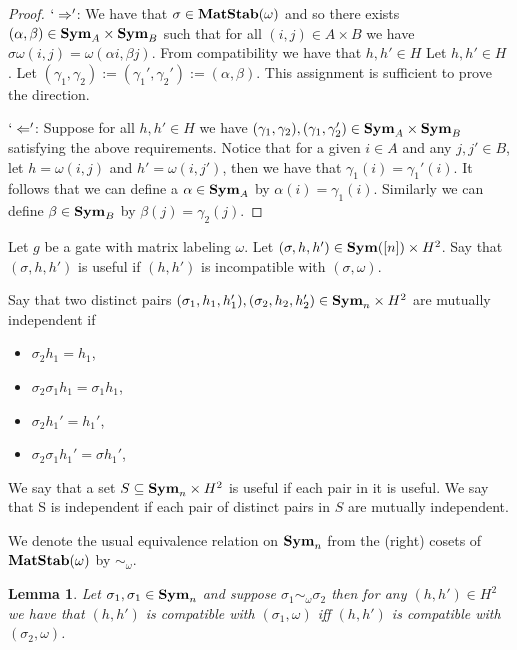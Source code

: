 \documentclass[12pt]{report}
\newtheorem{lem}[thm]{Lemma} \newtheorem{prop}[thm]{Proposition}
\newcommand{\matstab}{\text{\textbf{MatStab}}}
\newcommand{\sym}{\text{\textbf{Sym}}}
\begin{document}
\begin{proof}
  $`\Rightarrow'$: We have that $\sigma \in \matstab(\omega)$ and so there
  exists $(\alpha, \beta) \in \sym_A \times \sym_B$ such that for all $(i,j) \in
  A \times B$ we have $\sigma \omega (i,j) = \omega (\alpha i, \beta j)$. From
  compatibility we have that $h,h' \in H$ Let $h, h' \in H$ . Let $(\gamma_1,
  \gamma_2) := (\gamma_1', \gamma_2') := (\alpha, \beta)$. This assignment is
  sufficient to prove the direction.

  $`\Leftarrow'$: Suppose for all $h,h' \in H$ we have $(\gamma_1, \gamma_2),
  (\gamma_1, \gamma_2') \in \sym_A \times \sym_B$ satisfying the above
  requirements. Notice that for a given $i \in A$ and any $j, j' \in B$, let $h
  = \omega(i,j)$ and $h' = \omega(i,j')$, then we have that $\gamma_1 (i) =
  \gamma_1'(i)$. It follows that we can define a $\alpha \in \sym_A$ by
  $\alpha(i) = \gamma_1 (i)$. Similarly we can define $\beta \in \sym_B$ by
  $\beta (j) = \gamma_2 (j)$.

\end{proof}

\begin{definition}
  Let $g$ be a gate with matrix labeling $\omega$. Let $(\sigma, h, h') \in
  \sym([n]) \times H^2$. Say that $(\sigma, h, h')$ is useful if $(h,h')$ is
  incompatible with $(\sigma, \omega)$.

  Say that two distinct pairs $(\sigma_1, h_1, h_1'), (\sigma_2, h_2, h_2') \in
  \sym_n\times H^2$ are mutually independent if
  \begin{itemize}
    \setlength\itemsep{0mm}
  \item $\sigma_2 h_1 = h_1$,
  \item $\sigma_2 \sigma_1 h_1 = \sigma_1 h_1$,
  \item $\sigma_2 h_1' = h_1'$,
  \item $\sigma_2 \sigma_1 h_1' = \sigma h_1'$,
  \end{itemize}
  We say that a set $S \subseteq \sym_n \times H^2$ is useful if each pair in
  it is useful. We say that S is independent if each pair of distinct pairs in
  $S$ are mutually independent.
\end{definition}

We denote the usual equivalence relation on $\sym_n$ from the (right) cosets of
$\matstab(\omega)$ by $\sim_\omega$.

\begin{lem}
  Let $\sigma_1, \sigma_1 \in \sym_n$ and suppose $\sigma_1 \sim_\omega
  \sigma_2$ then for any $(h,h') \in H^2$ we have that $(h,h')$ is compatible
  with $(\sigma_1, \omega)$ iff $(h,h')$ is compatible with $(\sigma_2,
  \omega)$.
\end{lem}
\end{document}
